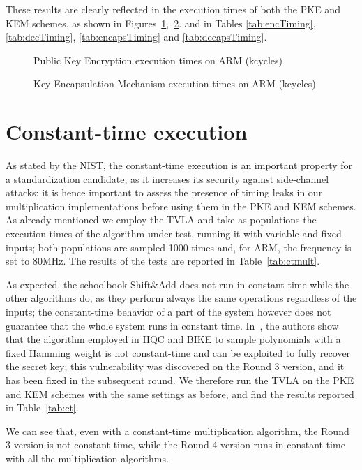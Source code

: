 These results are clearly reflected in the execution times of both the PKE and KEM schemes, as shown in Figures~\ref{fig:encdecTiming},~\ref{fig:encapsdecapsTiming}.
and in Tables \ref{tab:encTiming}, \ref{tab:decTiming}, \ref{tab:encapsTiming} and \ref{tab:decapsTiming}.

\begin{figure}[H]
    \subfloat[Encryption]{
        \ARMtimingplot{\armEncTiming}
    }
    \subfloat[Decryption]{
        \ARMtimingplotNoY{\armDecTiming}
    }
    \caption{Public Key Encryption execution times on ARM (kcycles)}
    \label{fig:encdecTiming}
\end{figure}

\begin{figure}[H]
    \subfloat[Encapsulation]{
        \ARMtimingplot{\armEncapsTiming}
        }
    \subfloat[Decapsulation]{
        \ARMtimingplotNoY{\armDecapsTiming}
    }
    \caption{Key Encapsulation Mechanism execution times on ARM (kcycles)}
    \label{fig:encapsdecapsTiming}
\end{figure}

\section{Constant-time execution}
As stated by the NIST, the constant-time execution is an important property for a standardization candidate, as it increases
its security against side-channel attacks: it is hence important to assess the presence of timing leaks in our multiplication implementations
before using them in the PKE and KEM schemes. As already mentioned we employ the TVLA and take as populations the execution times
of the algorithm under test, running it with variable and fixed inputs; both populations are sampled 1000 times and, for ARM,
the frequency is set to 80MHz. The results of the tests are reported in Table~\ref{tab:ctmult}.


As expected, the schoolbook Shift\&Add does not run in constant time while the other algorithms do, as they perform always the same
operations regardless of the inputs; the constant-time behavior of a part of the system however does not guarantee that the whole
system runs in constant time. In~\cite{DBLP:journals/tches/GuoHJLNS22}, the authors show that the algorithm employed in HQC and BIKE to sample polynomials
with a fixed Hamming weight is not constant-time and can be exploited to fully recover the secret key; this vulnerability was discovered
on the Round 3 version, and it has been fixed in the subsequent round. We therefore run the TVLA on the PKE and KEM schemes with
the same settings as before, and find the results reported in Table~\ref{tab:ct}.

\vspace{-15pt}
We can see that, even with a constant-time multiplication algorithm, the Round 3 version is not constant-time, while the Round 4 version
runs in constant time with all the multiplication algorithms. 

